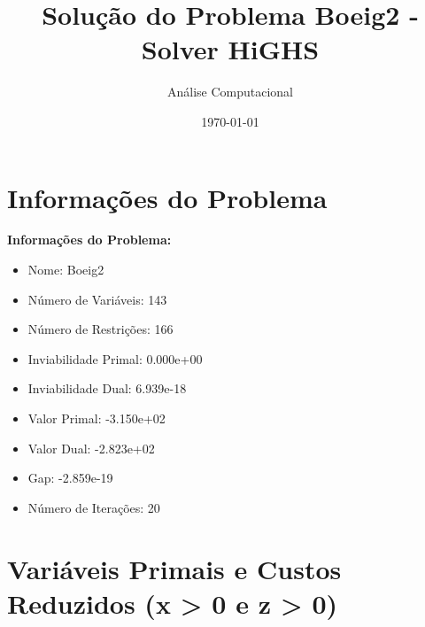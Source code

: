 \documentclass[12pt]{article}
\title{Solução do Problema Boeig2 - Solver HiGHS}
\author{Análise Computacional}
\date{\today}
\begin{document}
\maketitle

\section{Informações do Problema}

\textbf{Informações do Problema:}
\begin{itemize}
\item Nome: Boeig2
\item Número de Variáveis: 143
\item Número de Restrições: 166
\item Inviabilidade Primal: 0.000e+00
\item Inviabilidade Dual: 6.939e-18
\item Valor Primal: -3.150e+02
\item Valor Dual: -2.823e+02
\item Gap: -2.859e-19
\item Número de Iterações: 20
\end{itemize}


\section{Variáveis Primais e Custos Reduzidos (x > 0 e z > 0)}
\end{document}
